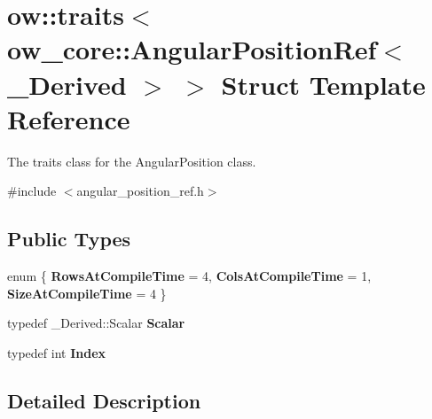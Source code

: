 \hypertarget{structow_1_1traits_3_01ow__core_1_1AngularPositionRef_3_01__Derived_01_4_01_4}{}\section{ow\+:\+:traits$<$ ow\+\_\+core\+:\+:Angular\+Position\+Ref$<$ \+\_\+\+Derived $>$ $>$ Struct Template Reference}
\label{structow_1_1traits_3_01ow__core_1_1AngularPositionRef_3_01__Derived_01_4_01_4}


The traits class for the Angular\+Position class.  




{\ttfamily \#include $<$angular\+\_\+position\+\_\+ref.\+h$>$}

\subsection*{Public Types}
\begin{DoxyCompactItemize}
\item 
enum \{ {\bfseries Rows\+At\+Compile\+Time} = 4, 
{\bfseries Cols\+At\+Compile\+Time} = 1, 
{\bfseries Size\+At\+Compile\+Time} = 4
 \}\hypertarget{structow_1_1traits_3_01ow__core_1_1AngularPositionRef_3_01__Derived_01_4_01_4_a3d4b68253235e6bdcb68522332a507bd}{}\label{structow_1_1traits_3_01ow__core_1_1AngularPositionRef_3_01__Derived_01_4_01_4_a3d4b68253235e6bdcb68522332a507bd}

\item 
typedef \+\_\+\+Derived\+::\+Scalar {\bfseries Scalar}\hypertarget{structow_1_1traits_3_01ow__core_1_1AngularPositionRef_3_01__Derived_01_4_01_4_ab0c3b37751a440fa117a12d1393e864d}{}\label{structow_1_1traits_3_01ow__core_1_1AngularPositionRef_3_01__Derived_01_4_01_4_ab0c3b37751a440fa117a12d1393e864d}

\item 
typedef int {\bfseries Index}\hypertarget{structow_1_1traits_3_01ow__core_1_1AngularPositionRef_3_01__Derived_01_4_01_4_a83afa2c25309d7fd8a02e8aac105cbae}{}\label{structow_1_1traits_3_01ow__core_1_1AngularPositionRef_3_01__Derived_01_4_01_4_a83afa2c25309d7fd8a02e8aac105cbae}

\end{DoxyCompactItemize}


\subsection{Detailed Description}

